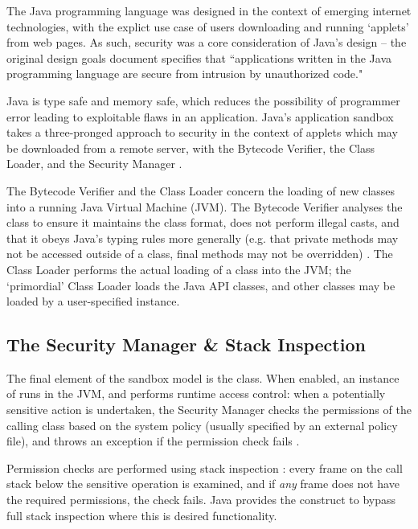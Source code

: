 The Java programming language was designed in the context of emerging internet technologies, with the explict use case of users downloading and running `applets' from web pages. As such, security was a core consideration of Java's design -- the original design goals document \cite{javadesignprinciples} specifies that ``applications written in the Java programming language are secure from intrusion by unauthorized code."

Java is type safe and memory safe, which reduces the possibility of programmer error leading to exploitable flaws in an application. Java's application sandbox takes a three-pronged approach to security in the context of applets which may be downloaded from a remote server, with the Bytecode Verifier, the Class Loader, and the Security Manager \cite{mcgraw1999securingjava}.

The Bytecode Verifier and the Class Loader concern the loading of new classes into a running Java Virtual Machine (JVM). The Bytecode Verifier analyses the class to ensure it maintains the class format, does not perform illegal casts, and that it obeys Java's typing rules more generally (e.g. that private methods may not be accessed outside of a class, final methods may not be overridden) \cite{lindholm2014java}. The Class Loader performs the actual loading of a class into the JVM; the `primordial' Class Loader \cite{mcgraw1999securingjava} loads the Java API classes, and other classes may be loaded by a user-specified  instance.

\subsection{The Security Manager \& Stack Inspection}

The final element of the sandbox model is the  class. When enabled, an instance of  runs in the JVM, and performs runtime access control: when a potentially sensitive action is undertaken, the Security Manager checks the permissions of the calling class based on the system policy (usually specified by an external policy file), and throws an exception if the permission check fails \cite{gosling2014java}.

Permission checks are performed using stack inspection \cite{gong2003javasecurity}: every frame on the call stack below the sensitive operation is examined, and if \textit{any} frame does not have the required permissions, the check fails. Java provides the  construct to bypass full stack inspection \cite{gong2003javasecurity} where this is desired functionality.

